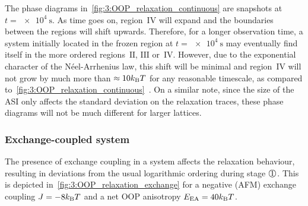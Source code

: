 \vspace{-1.5em}
\vspace{-1em}

The phase diagrams in~\cref{fig:3:OOP_relaxation_continuous} are snapshots at $t = \SI{e4}{\second}$.
As time goes on, region~$\mathrm{IV}$ will expand and the boundaries between the regions will shift upwards.
Therefore, for a longer observation time, a system initially located in the frozen region at $t = \SI{e4}{\second}$ may eventually find itself in the more ordered regions~$\mathrm{II}$, $\mathrm{III}$ or~$\mathrm{IV}$.
However, due to the exponential character of the N\'eel-Arrhenius law, this shift will be minimal and region~$\mathrm{IV}$ will not grow by much more than $\approx 10 \kBT$ for any reasonable timescale, as compared to~\cref{fig:3:OOP_relaxation_continuous}~\cite{KUR-24}.
On a similar note, since the size of the ASI only affects the standard deviation on the relaxation traces, these phase diagrams will not be much different for larger lattices.

\subsubsection{Exchange-coupled system}
The presence of exchange coupling in a system affects the relaxation behaviour, resulting in deviations from the usual logarithmic ordering during stage $\circled{1}$.
This is depicted in~\cref{fig:3:OOP_relaxation_exchange} for a negative (AFM) exchange coupling $J=-8\kBT$ and a net OOP anisotropy $\EEA = 40\kBT$.


